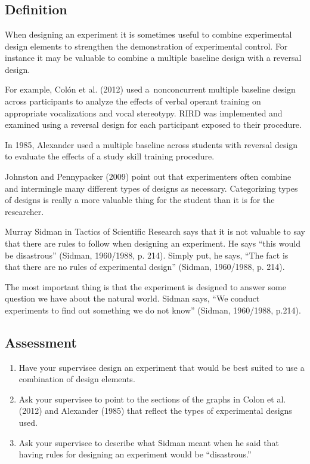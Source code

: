 \section{\fourbNine{}}
\subsection{Definition}
When designing an experiment it is sometimes useful to combine experimental design elements to strengthen the demonstration of experimental control. For instance it may be valuable to combine a multiple baseline design with a reversal design. 

For example, Colón et al. (2012) used a nonconcurrent multiple baseline design across participants to analyze the effects of verbal operant training on appropriate vocalizations and vocal stereotypy. RIRD was implemented and examined using a reversal design for each participant exposed to their procedure.

In 1985, Alexander used a multiple baseline across students with reversal design to evaluate the effects of a study skill training procedure.

Johnston and Pennypacker (2009) point out that experimenters often combine and intermingle many different types of designs as necessary. Categorizing types of designs is really a more valuable thing for the student than it is for the researcher. 

Murray Sidman in Tactics of Scientific Research says that it is not valuable to say that there are rules to follow when designing an experiment. He says ``this would be disastrous'' (Sidman, 1960/1988, p. 214). Simply put, he says, ``The fact is that there are no rules of experimental design'' (Sidman, 1960/1988, p. 214).

The most important thing is that the experiment is designed to answer some question we have about the natural world. Sidman says, ``We conduct experiments to find out something we do not know'' (Sidman, 1960/1988, p.214).
%
\subsection{Assessment}
\begin{enumerate}
\item Have your supervisee design an experiment that would be best suited to use a combination of design elements.
\item Ask your supervisee to point to the sections of the graphs in Colon et al. (2012) and Alexander (1985) that reflect the types of experimental designs used. 
\item Ask your supervisee to describe what Sidman meant when he said that having rules for designing an experiment would be ``disastrous.''
\end{enumerate}
%

